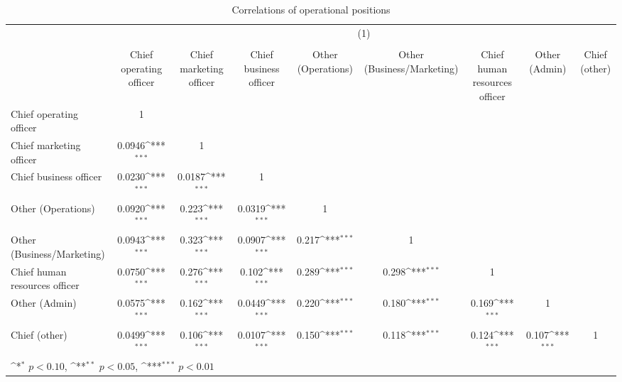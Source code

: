 \begin{table}[htbp]\centering
\def\sym#1{\ifmmode^{#1}\else\(^{#1}\)\fi}
\caption{Correlations of operational positions}
\begin{tabular}{l*{8}{c}}
\toprule
                &\multicolumn{8}{c}{(1)}                                                                                                                                \\
                &\multicolumn{8}{c}{}                                                                                                                                   \\
                &Chief operating officer         &Chief marketing officer         &Chief business officer         &Other (Operations)         &Other (Business/Marketing)         &Chief human resources officer         &Other (Admin)         &Chief (other)         \\
\midrule
Chief operating officer&        1         &                  &                  &                  &                  &                  &                  &                  \\
Chief marketing officer&   0.0946\sym{***}&        1         &                  &                  &                  &                  &                  &                  \\
Chief business officer&   0.0230\sym{***}&   0.0187\sym{***}&        1         &                  &                  &                  &                  &                  \\
Other (Operations)&   0.0920\sym{***}&    0.223\sym{***}&   0.0319\sym{***}&        1         &                  &                  &                  &                  \\
Other (Business/Marketing)&   0.0943\sym{***}&    0.323\sym{***}&   0.0907\sym{***}&    0.217\sym{***}&        1         &                  &                  &                  \\
Chief human resources officer&   0.0750\sym{***}&    0.276\sym{***}&    0.102\sym{***}&    0.289\sym{***}&    0.298\sym{***}&        1         &                  &                  \\
Other (Admin)   &   0.0575\sym{***}&    0.162\sym{***}&   0.0449\sym{***}&    0.220\sym{***}&    0.180\sym{***}&    0.169\sym{***}&        1         &                  \\
Chief (other)   &   0.0499\sym{***}&    0.106\sym{***}&   0.0107\sym{***}&    0.150\sym{***}&    0.118\sym{***}&    0.124\sym{***}&    0.107\sym{***}&        1         \\
\bottomrule
\multicolumn{9}{l}{\footnotesize \sym{*} \(p<0.10\), \sym{**} \(p<0.05\), \sym{***} \(p<0.01\)}\\
\end{tabular}
\end{table}
